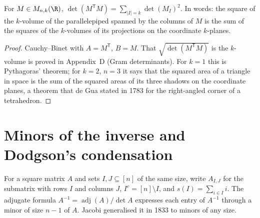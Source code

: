 \begin{corollary}\label{linear:cor:pythagoras}
For $M\in M_{n,k}(\R)$, $\det(M^{\mathsf T}M)=\sum_{|I|=k}\det(M_I)^2$. In words: the square of the $k$-volume of the
parallelepiped spanned by the columns of $M$ is the sum of the squares of the $k$-volumes of its projections on the
coordinate $k$-planes.
\end{corollary}
\begin{proof}
Cauchy--Binet with $A=M^{\mathsf T}$, $B=M$. That $\sqrt{\det(M^{\mathsf T}M)}$ is the $k$-volume is proved in Appendix~D
(Gram determinants). For $k=1$ this is Pythagoras' theorem; for $k=2$, $n=3$ it says that the squared area of a
triangle in space is the sum of the squared areas of its three shadows on the coordinate planes, a theorem that de Gua
stated in 1783 for the right-angled corner of a tetrahedron.
\end{proof}

\section{Minors of the inverse and Dodgson's condensation}\label{linear:sec:condensation}

For a square matrix $A$ and sets $I,J\subseteq[n]$ of the same size, write $A_{I,J}$ for the submatrix with rows $I$ and
columns $J$, $I^c=[n]\setminus I$, and $s(I)=\sum_{i\in I}i$. The adjugate formula $A^{-1}=\operatorname{adj}(A)/\det A$
expresses each entry of $A^{-1}$ through a minor of size $n-1$ of $A$. Jacobi generalised it in 1833 to minors of any size.

